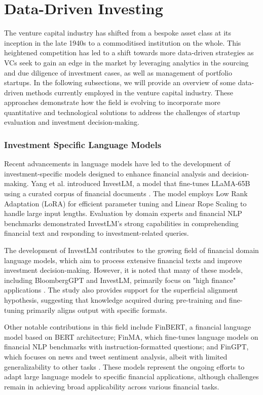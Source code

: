 \documentclass[a4paper, oneside]{discothesis}
\begin{document}
\section{Data-Driven Investing}
The venture capital industry has shifted from a bespoke asset class at its inception in the late 1940s to a commoditised institution on the whole. This heightened competition has led to a shift towards more data-driven strategies as VCs seek to gain an edge in the market by leveraging analytics in the sourcing and due diligence of investment cases, as well as management of portfolio startups. In the following subsections, we will provide an overview of some data-driven methods currently employed in the venture capital industry. These approaches demonstrate how the field is evolving to incorporate more quantitative and technological solutions to address the challenges of startup evaluation and investment decision-making.

\subsubsection{Investment Specific Language Models}
Recent advancements in language models have led to the development of investment-specific models designed to enhance financial analysis and decision-making. Yang et al. introduced InvestLM, a model that fine-tunes LLaMA-65B using a curated corpus of financial documents \cite{yang2023investlm}. The model employs Low Rank Adaptation (LoRA) for efficient parameter tuning and Linear Rope Scaling to handle large input lengths. Evaluation by domain experts and financial NLP benchmarks demonstrated InvestLM's strong capabilities in comprehending financial text and responding to investment-related queries.

The development of InvestLM contributes to the growing field of financial domain language models, which aim to process extensive financial texts and improve investment decision-making. However, it is noted that many of these models, including BloombergGPT and InvestLM, primarily focus on "high finance" applications \cite{yang2023investlm}. The study also provides support for the superficial alignment hypothesis, suggesting that knowledge acquired during pre-training and fine-tuning primarily aligns output with specific formats.

Other notable contributions in this field include FinBERT, a financial language model based on BERT architecture; FinMA, which fine-tunes language models on financial NLP benchmarks with instruction-formatted questions; and FinGPT, which focuses on news and tweet sentiment analysis, albeit with limited generalizability to other tasks \cite{araci2019finbert, liu2023finma, yang2023fingpt}. These models represent the ongoing efforts to adapt large language models to specific financial applications, although challenges remain in achieving broad applicability across various financial tasks.
\end{document}
